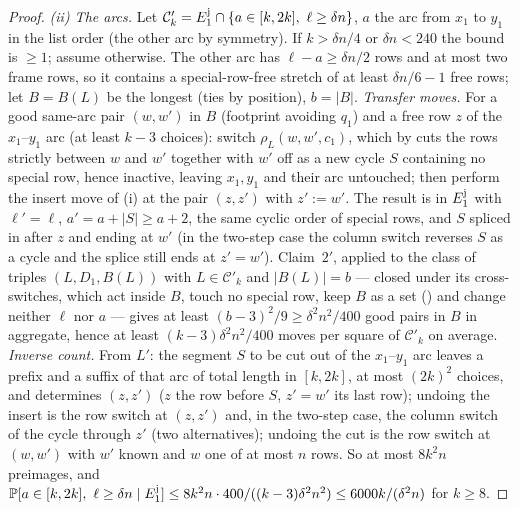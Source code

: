 \documentclass[11pt]{article}
\theoremstyle{definition}
\renewcommand{\Pr}{\mathbb{P}}
\begin{document}
\begin{proof}
\emph{(ii) The arcs.}  Let $\mathcal C'_k=E_1^{\rm j}\cap\{a\in[k,2k],\ \ell\ge\delta n\}$,
$a$ the arc from $x_1$ to $y_1$ in the list order (the other arc by symmetry).  If
$k>\delta n/4$ or $\delta n<240$ the bound is $\ge1$; assume otherwise.  The other arc has
$\ell-a\ge\delta n/2$ rows and at most two frame rows, so it contains a special-row-free
stretch of at least $\delta n/6-1$ free rows; let $B=B(L)$ be the longest (ties by
position), $b=|B|$.  \emph{Transfer moves.}  For a good same-arc pair $(w,w')$ in $B$
(footprint avoiding $q_1$) and a free row $z$ of the $x_1$--$y_1$ arc (at least $k-3$
choices): switch $\rho_L(w,w',c_1)$, which by \cite[Lemma~2.4(1)]{AM26} cuts the rows
strictly between $w$ and $w'$ together with $w'$ off as a new cycle $S$ containing no
special row, hence inactive, leaving $x_1,y_1$ and their arc untouched; then perform the
insert move of (i) at the pair $(z,z')$ with $z':=w'$.  The result is in $E_1^{\rm j}$ with
$\ell'=\ell$, $a'=a+|S|\ge a+2$, the same cyclic order of special rows, and $S$ spliced in
after $z$ and ending at $w'$ (in the two-step case the column switch reverses $S$ as a
cycle and the splice still ends at $z'=w'$).  Claim~$2'$, applied to the class of triples
$(L,D_1,B(L))$ with $L\in\mathcal C'_k$ and $|B(L)|=b$ --- closed under its cross-switches,
which act inside $B$, touch no special row, keep $B$ as a set (\cite[Remark~2.7]{AM26})
and change neither $\ell$ nor $a$ --- gives at least $(b-3)^2/9\ge\delta^2n^2/400$ good
pairs in $B$ in aggregate, hence at least $(k-3)\delta^2n^2/400$ moves per square of
$\mathcal C'_k$ on average.  \emph{Inverse count.}  From $L'$: the segment $S$ to be cut
out of the $x_1$--$y_1$ arc leaves a prefix and a suffix of that arc of total length in
$[k,2k]$, at most $(2k)^2$ choices, and determines $(z,z')$ ($z$ the row before $S$,
$z'=w'$ its last row); undoing the insert is the row switch at $(z,z')$ and, in the
two-step case, the column switch of the cycle through $z'$ (two alternatives); undoing the
cut is the row switch at $(w,w')$ with $w'$ known and $w$ one of at most $n$ rows.  So at
most $8k^2n$ preimages, and
$\Pr[a\in[k,2k],\ \ell\ge\delta n\mid E_1^{\rm j}]\le8k^2n\cdot400/((k-3)\delta^2n^2)\le6000k/(\delta^2n)$
for $k\ge8$.


\end{proof}
\end{document}
